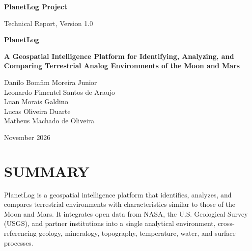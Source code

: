 \documentclass[12pt,letterpaper]{article}
\begin{document}
\begin{titlepage}
\thispagestyle{empty}
\sffamily


\vspace*{0.4cm}
{\large\bfseries PlanetLog Project}

\vspace{3.5cm}
{\small Technical Report, Version 1.0}

\vspace{1.2cm}
{\Huge\bfseries PlanetLog}

\vspace{0.4cm}
{\Large\bfseries A Geospatial Intelligence Platform for Identifying, Analyzing, and Comparing Terrestrial Analog Environments of the Moon and Mars}

\vspace{1.6cm}
{\large
Danilo Bomfim Moreira Junior\\
Leonardo Pimentel Santos de Araujo\\
Luan Morais Galdino\\
Lucas Oliveira Duarte\\
Matheus Machado de Oliveira}

\vfill
{\large November 2026}
\end{titlepage}

\setcounter{page}{1}

\section*{\sffamily\bfseries SUMMARY}

PlanetLog is a geospatial intelligence platform that identifies, analyzes, and compares terrestrial environments with characteristics similar to those of the Moon and Mars. It integrates open data from NASA, the U.S. Geological Survey (USGS), and partner institutions into a single analytical environment, cross-referencing geology, mineralogy, topography, temperature, water, and surface processes.
\end{document}
